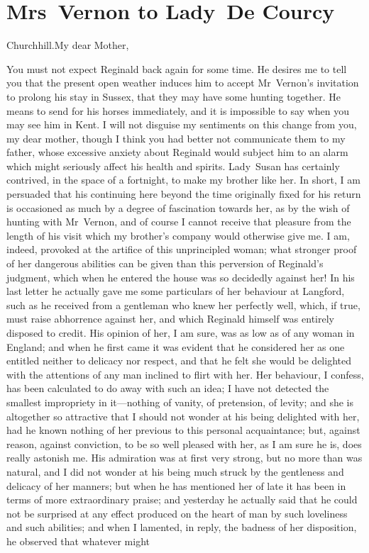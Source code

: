 \chapter{Mrs~Vernon to Lady~De Courcy}
  
  	\begin{letter}
	\vspace{5em}
	\end{letter}
	
  \begin{mail}{Churchhill.}{My dear Mother,}
 
 You must not expect Reginald back again for some time. He desires me to tell you that the present open weather induces him to accept Mr~Vernon's invitation to prolong his stay in Sussex, that they may have some hunting together. He means to send for his horses immediately, and it is impossible to say when you may see him in Kent. I will not disguise my sentiments on this change from you, my dear mother, though I think you had better not communicate them to my father, whose excessive anxiety about Reginald would subject him to an alarm which might seriously affect his health and spirits. Lady~Susan has certainly contrived, in the space of a fortnight, to make my brother like her. In short, I am persuaded that his continuing here beyond the time originally fixed for his return is occasioned as much by a degree of fascination towards her, as by the wish of hunting with Mr~Vernon, and of course I cannot receive that pleasure from the length of his visit which my brother's company would otherwise give me. I am, indeed, provoked at the artifice of this unprincipled woman; what stronger proof of her dangerous abilities can be given than this perversion of Reginald's judgment, which when he entered the house was so decidedly against her! In his last letter he actually gave me some particulars of her behaviour at Langford, such as he received from a gentleman who knew her perfectly well, which, if true, must raise abhorrence against her, and which Reginald himself was entirely disposed to credit. His opinion of her, I am sure, was as low as of any woman in England; and when he first came it was evident that he considered her as one entitled neither to delicacy nor respect, and that he felt she would be delighted with the attentions of any man inclined to flirt with her. Her behaviour, I confess, has been calculated to do away with such an idea; I have not detected the smallest impropriety in it—nothing of vanity, of pretension, of levity; and she is altogether so attractive that I should not wonder at his being delighted with her, had he known nothing of her previous to this personal acquaintance; but, against reason, against conviction, to be so well pleased with her, as I am sure he is, does really astonish me. His admiration was at first very strong, but no more than was natural, and I did not wonder at his being much struck by the gentleness and delicacy of her manners; but when he has mentioned her of late it has been in terms of more extraordinary praise; and yesterday he actually said that he could not be surprised at any effect produced on the heart of man by such loveliness and such abilities; and when I lamented, in reply, the badness of her disposition, he observed that whatever might 
\end{mail}
